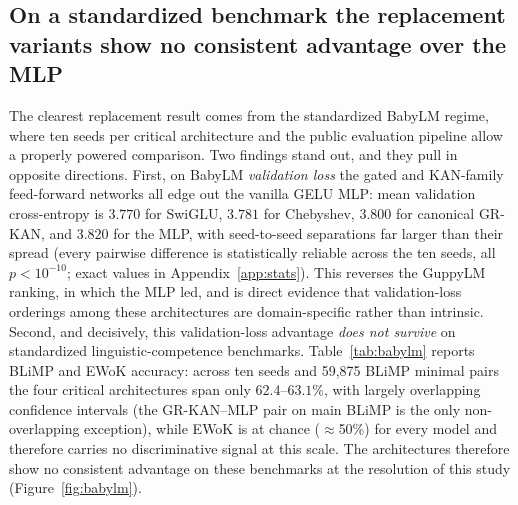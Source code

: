 \documentclass{article}
\newcommand{\modelname}[1]{\textsc{#1}}
\newcommand{\grkan}{\modelname{GR-KAN}}
\begin{document}
\subsection{On a standardized benchmark the replacement variants show no consistent advantage over the MLP}
\label{sec:replacement}

The clearest replacement result comes from the standardized BabyLM regime, where ten seeds per critical architecture and the public evaluation pipeline allow a properly powered comparison. Two findings stand out, and they pull in opposite directions. First, on BabyLM \emph{validation loss} the gated and KAN-family feed-forward networks all edge out the vanilla GELU MLP: mean validation cross-entropy is \(3.770\) for SwiGLU, \(3.781\) for Chebyshev, \(3.800\) for canonical \grkan{}, and \(3.820\) for the MLP, with seed-to-seed separations far larger than their spread (every pairwise difference is statistically reliable across the ten seeds, all \(p<10^{-10}\); exact values in Appendix~\ref{app:stats}). This reverses the GuppyLM ranking, in which the MLP led, and is direct evidence that validation-loss orderings among these architectures are domain-specific rather than intrinsic. Second, and decisively, this validation-loss advantage \emph{does not survive} on standardized linguistic-competence benchmarks. Table~\ref{tab:babylm} reports BLiMP and EWoK accuracy: across ten seeds and 59,875 BLiMP minimal pairs the four critical architectures span only \(62.4\)--\(63.1\%\), with largely overlapping confidence intervals (the \grkan{}--MLP pair on main BLiMP is the only non-overlapping exception), while EWoK is at chance (\(\approx\)50\%) for every model and therefore carries no discriminative signal at this scale. The architectures therefore show no consistent advantage on these benchmarks at the resolution of this study (Figure~\ref{fig:babylm}).
\end{document}
